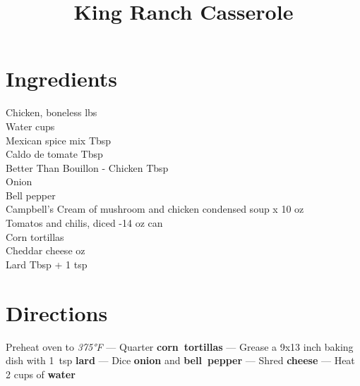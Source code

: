\documentclass[11pt,letterpaper]{article}
\title{King Ranch Casserole}
\author{}
\date{}
\begin{document}
\maketitle
\thispagestyle{empty}

\section*{Ingredients}
\setlength{\columnsep}{20pt}
\begin{multicols}{2}
\noindent
    Chicken, boneless  lbs \\
    Water  cups \\
    Mexican spice mix  Tbsp \\
    Caldo de tomate  Tbsp \\
    Better Than Bouillon - Chicken  Tbsp \\
    Onion  \\
    \columnbreak
    Bell pepper  \\
    Campbell's Cream of mushroom and chicken condensed soup  x 10 oz \\
    Tomatos and chilis, diced -14 oz can \\
    Corn tortillas  \\
    Cheddar cheese  oz \\
    Lard  Tbsp + 1 tsp
\end{multicols}

\section*{Directions}

\noindent
Preheat oven to \textit{375°F} ---
Quarter \textbf{corn~tortillas} ---
Grease a 9x13 inch baking dish with 1~tsp \textbf{lard} ---
Dice \textbf{onion} and \textbf{bell~pepper} ---
Shred \textbf{cheese} ---
Heat 2 cups of \textbf{water}
\end{document}
